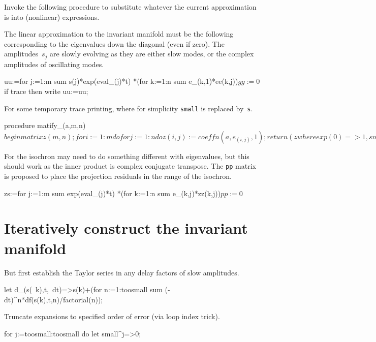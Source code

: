 \documentclass[11pt,a5paper]{article}
\begin{document}
Invoke the following procedure to substitute whatever the
current approximation is into (nonlinear) expressions.


The linear approximation to the invariant manifold must be
the following corresponding to the eigenvalues down the
diagonal (even if zero).  The amplitudes~$s_j$ are slowly
evolving as they are either slow modes, or the complex
amplitudes of oscillating modes.
\begin{reduce}
uu:=for j:=1:m sum s(j)*exp(eval_(j)*t)
  *(for k:=1:n sum e_(k,1)*ee(k,j))$
gg:=0$
if trace then write uu:=uu;
\end{reduce}

For some temporary trace printing, where for simplicity
\verb|small| is replaced by~\verb|s|.
\begin{reduce}
procedure matify_(a,m,n)$
  begin matrix z(m,n);
    for i:=1:m do for j:=1:n do z(i,j):=coeffn(a,e_(i,j),1);
    return (z where {exp(0)=>1,small=>s}); 
    end$
\end{reduce}

For the isochron may need to do something different with
eigenvalues, but this should work as the inner product is
complex conjugate transpose. The \verb|pp| matrix is
proposed to place the projection residuals in the range of
the isochron. 
\begin{reduce}
zs:=for j:=1:m sum exp(eval_(j)*t)
  *(for k:=1:n sum e_(k,j)*zz(k,j))$
pp:=0$
\end{reduce}




\section{Iteratively construct the invariant manifold}

But first establish the Taylor series in any delay factors
of slow amplitudes.
\begin{reduce}
let d_(s(~k),t,~dt)=>s(k)+(for n:=1:toosmall sum 
        (-dt)^n*df(s(k),t,n)/factorial(n));
\end{reduce}

Truncate expansions to specified order of error (via loop
index trick).
\begin{reduce}
for j:=toosmall:toosmall do let small^j=>0;
\end{reduce}
\end{document}
